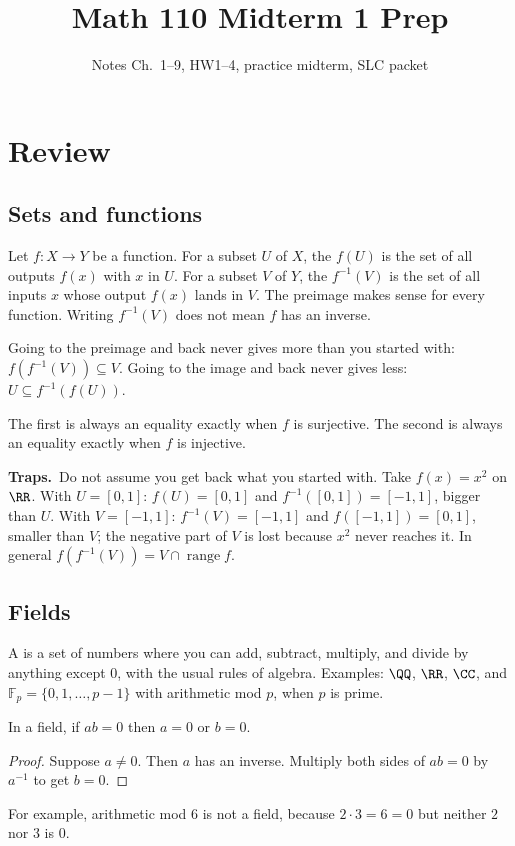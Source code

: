 \documentclass[11pt]{scrartcl}
\title{Math 110 Midterm 1 Prep}
\subtitle{Notes Ch.~1--9, HW1--4, practice midterm, SLC packet}
\author{}
\date{}
\DeclareMathOperator{\range}{range}
\newcommand{\Fp}{\mathbb F_p}
\newcommand{\traps}{\par\medskip\noindent\textbf{\color{RawSienna}Traps.}\ }
\begin{document}
\maketitle

\section{Review}

\subsection{Sets and functions}
Let $f\colon X\to Y$ be a function.
For a subset $U$ of $X$, the  $f(U)$ is the set of all outputs $f(x)$ with $x$ in $U$.
For a subset $V$ of $Y$, the  $f^{-1}(V)$ is the set of all inputs $x$ whose output $f(x)$ lands in $V$.
The preimage makes sense for every function. Writing $f^{-1}(V)$ does not mean $f$ has an inverse.

\begin{proposition*}[HW1 P1]
  Going to the preimage and back never gives more than you started with: $f(f^{-1}(V))\subseteq V$.
  Going to the image and back never gives less: $U\subseteq f^{-1}(f(U))$.
  \begin{itemize}
    \ii The first is always an equality exactly when $f$ is surjective.
    \ii The second is always an equality exactly when $f$ is injective.
  \end{itemize}
\end{proposition*}

\traps Do not assume you get back what you started with. Take $f(x)=x^2$ on $\RR$.
With $U=[0,1]$: $f(U)=[0,1]$ and $f^{-1}([0,1])=[-1,1]$, bigger than $U$.
With $V=[-1,1]$: $f^{-1}(V)=[-1,1]$ and $f([-1,1])=[0,1]$, smaller than $V$; the negative part of $V$ is lost because $x^2$ never reaches it.
In general $f(f^{-1}(V))=V\cap\range f$.

\subsection{Fields}
A  is a set of numbers where you can add, subtract, multiply, and divide by anything except $0$, with the usual rules of algebra.
Examples: $\QQ$, $\RR$, $\CC$, and $\Fp=\{0,1,\dots,p-1\}$ with arithmetic mod $p$, when $p$ is prime.

\begin{proposition*}[HW1 P3]
  In a field, if $ab=0$ then $a=0$ or $b=0$.
\end{proposition*}
\begin{proof}
  Suppose $a\ne0$. Then $a$ has an inverse. Multiply both sides of $ab=0$ by $a^{-1}$ to get $b=0$.
\end{proof}
For example, arithmetic mod $6$ is not a field, because $2\cdot3=6=0$ but neither $2$ nor $3$ is $0$.
\end{document}

